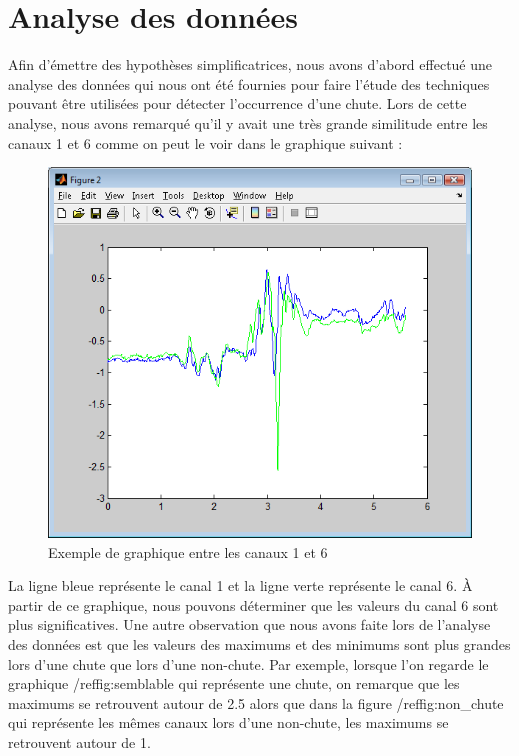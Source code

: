 \documentclass[12pt,letterpaper]{article}
\begin{document}
\section{Analyse des données} %
Afin d'émettre des hypothèses simplificatrices, nous avons d'abord effectué une analyse des données qui nous ont été fournies pour faire l'étude des techniques pouvant être utilisées pour détecter l'occurrence d'une chute. Lors de cette analyse, nous avons remarqué qu'il y avait une très grande similitude entre les canaux 1 et 6 comme on peut le voir dans le graphique suivant :

\begin{figure}
\centering
\includegraphics[scale=0.5]{images/semblable.png}
\caption{Exemple de graphique entre les canaux 1 et 6}
\label{fig:semblable}
\end{figure}

La ligne bleue représente le canal 1 et la ligne verte représente le canal 6. À partir de ce graphique, nous pouvons déterminer que les valeurs du canal 6 sont plus significatives. Une autre observation que nous avons faite lors de l'analyse des données est que les valeurs des maximums et des minimums sont plus grandes lors d'une chute que lors d'une non-chute. Par exemple, lorsque l'on regarde le graphique /ref{fig:semblable} qui représente une chute, on remarque que les maximums se retrouvent autour de 2.5 alors que dans la figure /ref{fig:non\_chute} qui représente les mêmes canaux lors d'une non-chute, les maximums se retrouvent autour de 1.
\end{document}
